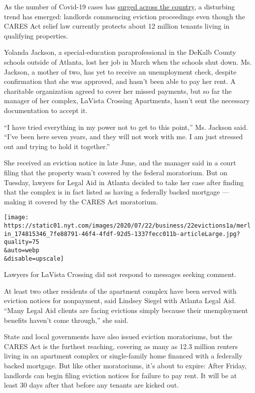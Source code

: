 As the number of Covid-19 cases has
\href{https://www.nytimes.com/interactive/2020/us/coronavirus-us-cases.html}{surged
across the country}, a disturbing trend has emerged: landlords
commencing eviction proceedings even though the CARES Act relief law
currently protects about 12 million tenants living in qualifying
properties.

Yolanda Jackson, a special-education paraprofessional in the DeKalb
County schools outside of Atlanta, lost her job in March when the
schools shut down. Ms. Jackson, a mother of two, has yet to receive an
unemployment check, despite confirmation that she was approved, and
hasn't been able to pay her rent. A charitable organization agreed to
cover her missed payments, but so far the manager of her complex,
LaVista Crossing Apartments, hasn't sent the necessary documentation to
accept it.

``I have tried everything in my power not to get to this point,'' Ms.
Jackson said. ``I've been here seven years, and they will not work with
me. I am just stressed out and trying to hold it together.''

She received an eviction notice in late June, and the manager said in a
court filing that the property wasn't covered by the federal moratorium.
But on Tuesday, lawyers for Legal Aid in Atlanta decided to take her
case after finding that the complex is in fact listed as having a
federally backed mortgage --- making it covered by the CARES Act
moratorium.

\texttt{[image: https://static01.nyt.com/images/2020/07/22/business/22evictions1a/merlin\_174815346\_7fe88791-46f4-4fdf-92d5-1337fecc011b-articleLarge.jpg?quality=75\\\&auto=webp\\\&disable=upscale]}

Lawyers for LaVista Crossing did not respond to messages seeking
comment.

At least two other residents of the apartment complex have been served
with eviction notices for nonpayment, said Lindsey Siegel with Atlanta
Legal Aid. ``Many Legal Aid clients are facing evictions simply because
their unemployment benefits haven't come through,'' she said.

State and local governments have also issued eviction moratoriums, but
the CARES Act is the furthest reaching, covering as many as 12.3 million
renters living in an apartment complex or single-family home financed
with a federally backed mortgage. But like other moratoriums, it's about
to expire: After Friday, landlords can begin filing eviction notices for
failure to pay rent. It will be at least 30 days after that before any
tenants are kicked out.

